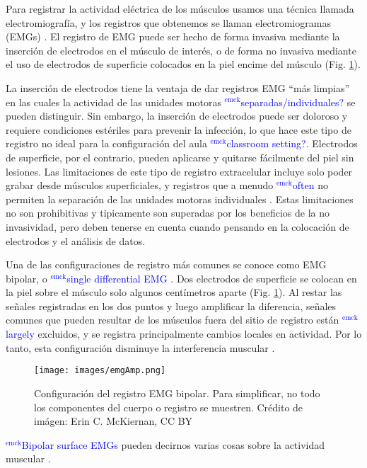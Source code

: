 \documentclass[12pt]{article}
\newcommand{\emck}[1]{\textcolor{blue}{$^{\textrm{emck}}${#1}}}
\begin{document}
Para registrar la actividad eléctrica de los músculos usamos una
técnica llamada electromiografía, y los registros que obtenemos se
llaman electromiogramas (EMGs) \cite{garcia2011surface}. El registro
de EMG puede ser hecho de forma invasiva mediante la
inserción de electrodos en el músculo de interés, o de forma no
invasiva mediante el uso de electrodos de superficie colocados en la
piel encime del músculo (Fig. \ref{fig:emg}).

La inserción de electrodos tiene la ventaja de dar registros EMG ``más
limpias'' en las cuales la actividad de las unidades motoras
\emck{separadas/individuales?} se pueden distinguir. Sin embargo, la
inserción de electrodos puede ser doloroso y requiere condiciones
estériles para prevenir la infección, lo que hace este tipo de
registro no ideal para la configuración del aula \emck{classroom
  setting?}. Electrodos de superficie, por el contrario, pueden
aplicarse y quitarse fácilmente del piel sin lesiones. Las
limitaciones de este tipo de registro extracelular incluye solo poder
grabar desde músculos superficiales, y registros que a menudo
\emck{often} no permiten la separación de las unidades motoras
individuales \cite{garcia2011surface}. Estas limitaciones no son
prohibitivas y tipicamente son superadas por los beneficios de la no
invasividad, pero deben tenerse en cuenta cuando pensando en la
colocación de electrodos y el análisis de datos.

Una de las configuraciones de registro más comunes se conoce como EMG
bipolar, o \emck{single differential EMG}
\cite{garcia2011surface}. Dos electrodos de superficie se colocan en
la piel sobre el músculo solo algunos centímetros aparte
(Fig. \ref{fig:emg}). Al restar las señales registradas en los dos
puntos y luego amplificar la diferencia, señales comunes que pueden
resultar de los músculos fuera del sitio de registro están
\emck{largely} excluidos, y se registra principalmente cambios locales
en actividad. Por lo tanto, esta configuración disminuye la
interferencia muscular \cite{garcia2011surface}.

\begin{figure}[h!]
\centering
\texttt{[image: images/emgAmp.png]}
\caption{Configuración del registro EMG bipolar. Para simplificar, no
  todo los componentes del cuerpo o registro se muestren. Crédito de
  imágen: Erin C. McKiernan, CC BY}
\label{fig:emg}
\end{figure}

\emck{Bipolar surface EMGs} pueden decirnos varias cosas sobre la
actividad muscular \cite{garcia2011surface}.
\end{document}
